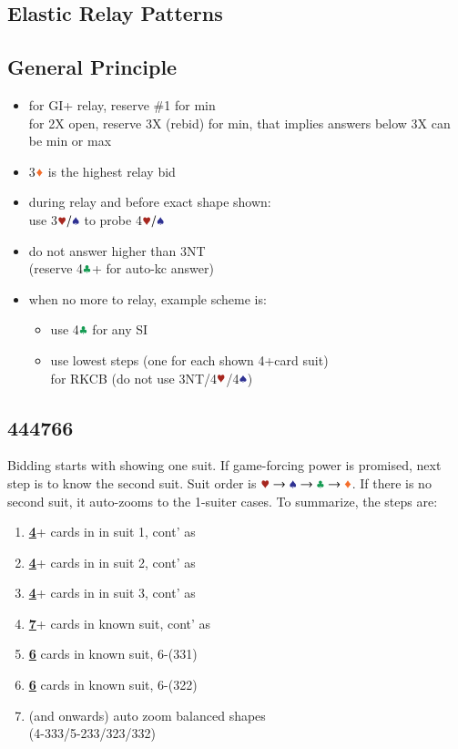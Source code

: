 \documentclass{article}
\begin{document}
\begin{multicols}{2}
\begin{CJK*}{UTF8}{gt}
\section{Elastic Relay Patterns}

\subsection{General Principle}
\begin{itemize}
    \item for GI+ relay, reserve \#1 for min \\
        for 2X open, reserve 3X (rebid) for min,
        that implies answers below 3X can be min or max
    \item 3$\ddd$ is the highest relay bid
    \item during relay and before exact shape shown: \\
        use 3$\hhh/\sss$ to probe 4$\hhh/\sss$
    \item do not answer higher than 3NT \\
        (reserve 4$\ccc$+ for auto-kc answer)
    \item when no more to relay, example scheme is:
    \begin{itemize}
        \item use 4$\ccc$ for any SI
        \item use lowest steps (one for each shown 4+card suit) \\
            for RKCB (do not use 3NT/4$\hhh$/4$\sss$)
    \end{itemize}
\end{itemize}

\subsection{444766}\label{sec:444766}
Bidding starts with showing one suit. If game-forcing power is promised, next step is to know the second suit.
Suit order is $\hscd$. If there is no second suit, it auto-zooms to the 1-suiter cases. To summarize, the steps are:

\begin{enumerate}
    \item \textbf{\underline{4}}+ cards in in suit 1, cont' as 
    \item \textbf{\underline{4}}+ cards in in suit 2, cont' as
    \item \textbf{\underline{4}}+ cards in in suit 3, cont' as
    \item \textbf{\underline{7}}+ cards in known suit, cont' as
    \item \textbf{\underline{6}} cards in known suit, 6-(331)
    \item \textbf{\underline{6}} cards in known suit, 6-(322)
    \item (and onwards) auto zoom balanced shapes \\
        (4-333/5-233/323/332)
\end{enumerate}


\end{CJK*}
\end{multicols}
\end{document}
